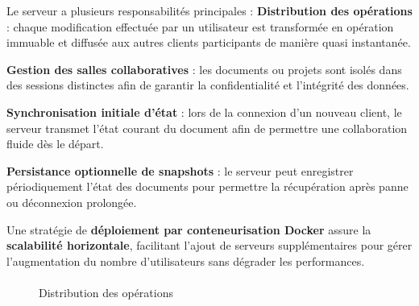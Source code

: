 \documentclass[a4paper,oneside,12pt]{book}
\begin{document}
Le serveur a plusieurs responsabilités principales :  
	\textbf{Distribution des opérations} : chaque modification effectuée par un utilisateur est transformée en opération immuable et diffusée aux autres clients participants de manière quasi instantanée.
	
	\textbf{Gestion des salles collaboratives} : les documents ou projets sont isolés dans des sessions distinctes afin de garantir la confidentialité et l’intégrité des données.
	
	\textbf{Synchronisation initiale d’état} : lors de la connexion d’un nouveau client, le serveur transmet l’état courant du document afin de permettre une collaboration fluide dès le départ.
	
	\textbf{Persistance optionnelle de snapshots} : le serveur peut enregistrer périodiquement l’état des documents pour permettre la récupération après panne ou déconnexion prolongée.

Une stratégie de \textbf{déploiement par conteneurisation Docker} assure la \textbf{scalabilité horizontale}, facilitant l’ajout de serveurs supplémentaires pour gérer l’augmentation du nombre d’utilisateurs sans dégrader les performances.

\paragraph{}


\begin{figure}[H]
	\centering
{}
\caption{Distribution des opérations}
\label{fig:serveur_websocket}
\end{figure}%
\end{document}
